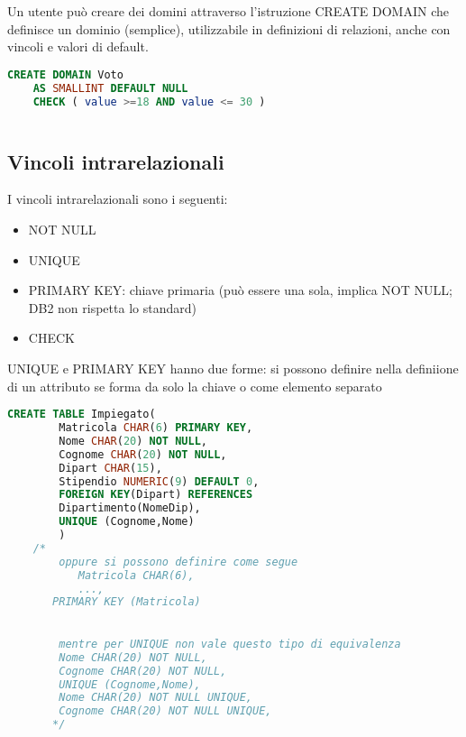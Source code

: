 \documentclass{article}
\begin{document}
Un utente può creare dei domini attraverso l'istruzione CREATE DOMAIN che definisce un dominio (semplice), utilizzabile in definizioni di relazioni, anche con vincoli e valori di default.

\begin{center}
    
   \begin{lstlisting}[language=SQL]
     CREATE DOMAIN Voto
    AS SMALLINT DEFAULT NULL
    CHECK ( value >=18 AND value <= 30 )
        
    \end{lstlisting} 
\end{center}

\subsection{Vincoli intrarelazionali}
I vincoli intrarelazionali sono i seguenti:
\begin{itemize}
    \item NOT NULL
    \item UNIQUE
    \item PRIMARY KEY: chiave primaria (può essere una sola, implica NOT NULL; DB2 non rispetta lo standard)
    \item CHECK
    
\end{itemize}
UNIQUE e PRIMARY KEY hanno due forme: si possono definire nella definiione di un attributo se forma da solo la chiave o come elemento separato

\begin{center}
    
   \begin{lstlisting}[language=SQL]
        CREATE TABLE Impiegato(
        Matricola CHAR(6) PRIMARY KEY,
        Nome CHAR(20) NOT NULL,
        Cognome CHAR(20) NOT NULL,
        Dipart CHAR(15),
        Stipendio NUMERIC(9) DEFAULT 0,
        FOREIGN KEY(Dipart) REFERENCES
        Dipartimento(NomeDip),
        UNIQUE (Cognome,Nome)
        )      
    /* 
        oppure si possono definire come segue
           Matricola CHAR(6),
           ...,
       PRIMARY KEY (Matricola)

       
        mentre per UNIQUE non vale questo tipo di equivalenza
        Nome CHAR(20) NOT NULL,
        Cognome CHAR(20) NOT NULL,
        UNIQUE (Cognome,Nome),
        Nome CHAR(20) NOT NULL UNIQUE,
        Cognome CHAR(20) NOT NULL UNIQUE, 
       */ 
    \end{lstlisting} 
\end{center}
\end{document}
